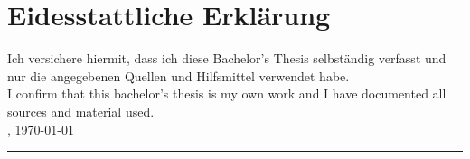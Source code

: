 \chapter{Eidesstattliche Erkl\"arung}
Ich versichere hiermit, dass ich diese Bachelor's Thesis selbständig verfasst und nur die angegebenen Quellen und Hilfsmittel verwendet habe.
\\[1cm]
I confirm that this bachelor's thesis is my own work and I have documented all sources and material used.
\\[6ex]

\city, \today

\vspace{1.5cm}
\rule[-0.2cm]{5cm}{0.5pt}

\textsc{\authorname} 
